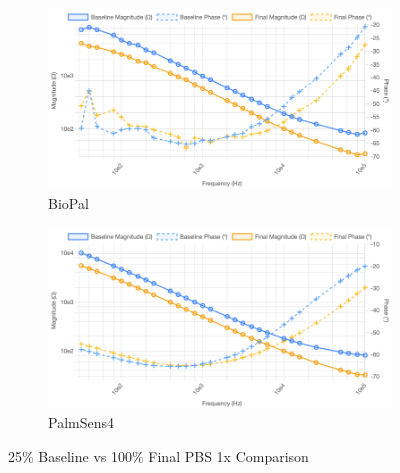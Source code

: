 \begin{figure}[H]
    \centering
    \begin{subfigure}{0.48\textwidth}
        \includegraphics[width=\textwidth]{PBS_25_cropped.png}
        \caption{BioPal}
        \label{fig:25_pbs_biopal}
    \end{subfigure}
    \hfill
    \begin{subfigure}{0.48\textwidth}
        \includegraphics[width=\textwidth]{PalmSens_25.png}
        \caption{PalmSens4}
        \label{fig:25_pbs_palmsens}
    \end{subfigure}
    \caption{25\% Baseline vs 100\% Final PBS 1x Comparison}
    \label{fig:25_pbs_comparison}
\end{figure}


